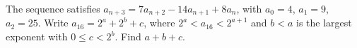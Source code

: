 The sequence satisfies $a_{n+3}=7a_{n+2}-14a_{n+1}+8a_n$, with $a_0=4$, $a_1=9$, $a_2=25$. Write $a_{16}=2^a+2^b+c$, where $2^a<a_{16}<2^{a+1}$ and $b<a$ is the largest exponent with $0\le c<2^b$. Find $a+b+c$.
